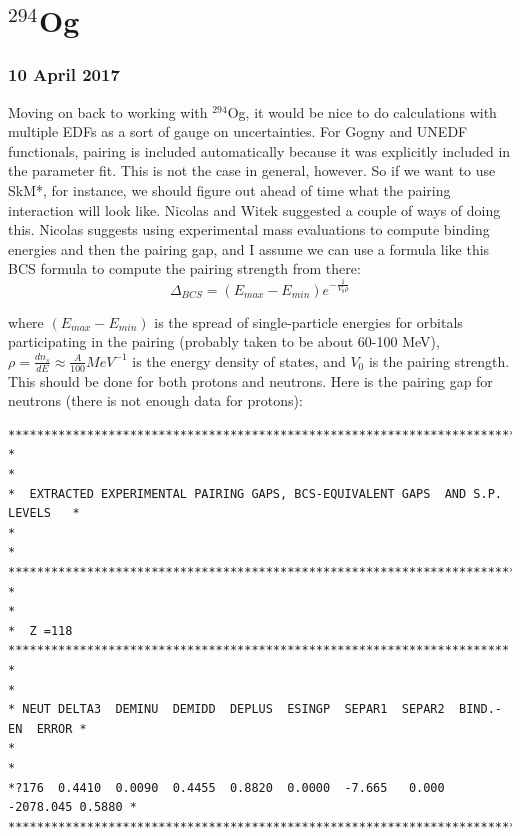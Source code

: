 \chapter{$^{294}$Og}
\maketitle

\subsection*{10 April 2017}
Moving on back to working with $^{294}$Og, it would be nice to do calculations with multiple EDFs as a sort of gauge on uncertainties. For Gogny and UNEDF functionals, pairing is included automatically because it was explicitly included in the parameter fit. This is not the case in general, however. So if we want to use SkM*, for instance, we should figure out ahead of time what the pairing interaction will look like. Nicolas and Witek suggested a couple of ways of doing this. Nicolas suggests using experimental mass evaluations to compute binding energies and then the pairing gap, and I assume we can use a formula like this BCS formula to compute the pairing strength from there:
\begin{equation}
\Delta_{BCS} = (E_{max}-E_{min})e^{-\frac{1}{V_0\rho}}
\end{equation}

\noindent where $(E_{max}-E_{min})$ is the spread of single-particle energies for orbitals participating in the pairing (probably taken to be about 60-100 MeV), $\rho = \frac{dn_s}{dE} \approx \frac{A}{100} MeV^{-1}$ is the energy density of states, and $V_0$ is the pairing strength. This should be done for both protons and neutrons. Here is the pairing gap for neutrons (there is not enough data for protons):

\begin{verbatim}
********************************************************************************
*                                                                              *
*  EXTRACTED EXPERIMENTAL PAIRING GAPS, BCS-EQUIVALENT GAPS  AND S.P. LEVELS   *
*                                                                              *
********************************************************************************
*                                                                              *
*  Z =118 **********************************************************************
*                                                                              *
* NEUT DELTA3  DEMINU  DEMIDD  DEPLUS  ESINGP  SEPAR1  SEPAR2  BIND.-EN  ERROR *
*                                                                              *
*?176  0.4410  0.0090  0.4455  0.8820  0.0000  -7.665   0.000 -2078.045 0.5880 *
********************************************************************************
\end{verbatim}

